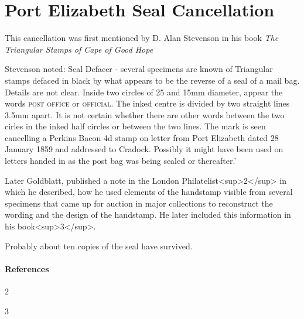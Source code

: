 \chapter{Port Elizabeth Seal Cancellation}    

This cancellation was first  mentioned by D. Alan Stevenson in his book
\textit{The Triangular Stamps of Cape of Good Hope} 

 
Stevenson noted:
Seal Defacer - several specimens are known of Triangular stamps defaced in black by what appears to be the reverse of a seal of a mail bag. Details are not clear.  Inside two circles of 25 and 15mm diameter, appear the words  \textsc{post office} or \textsc{official}. The inked centre is divided by two straight lines 3.5mm apart. It is not certain whether there are other words between the two cirles in the inked half circles or between the two lines. The mark is seen cancelling a Perkins Bacon 4d stamp on letter from Port Elizabeth dated 28 January 1859 and addressed to Cradock. Possibly it might have been used on letters handed in as the post bag was being sealed or thereafter.'

Later Goldblatt, published a note in the London Philatelist<sup>2</sup> in which he described, how he used elements of the handstamp visible from several specimens that came up for auction in major collections to reconstruct the wording and the design of the handstamp. He later included this information in his book<sup>3</sup>.



Probably about ten copies of the seal have survived. 

\subsubsection{References}

2     

3         